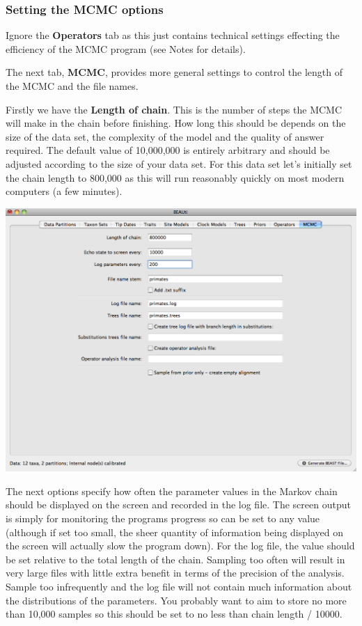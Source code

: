 \documentclass[12pt]{article}
\begin{document}
\medskip{}


\subsubsection*{Setting the MCMC options }

Ignore the \textbf{Operators} tab as this just contains technical
settings effecting the efficiency of the MCMC program (see Notes for details). 

The next tab, {\bf MCMC}, provides more general
settings to control the length of the MCMC and the file names. 

Firstly we have the \textbf{Length of chain}. This is the number of
steps the MCMC will make in the chain before finishing. How long this
should be depends on the size of the data set, the complexity of the
model and the quality of answer required. The default value of 10,000,000
is entirely arbitrary and should be adjusted according to the size
of your data set. For this data set let's initially set the chain
length to 800,000 as this will run reasonably quickly on most modern
computers (a few minutes).

\medskip{}

\includegraphics[scale=0.4]{figures/BEAUti_MCMC}

\medskip{}

The next options specify how often the parameter values in the Markov
chain should be displayed on the screen and recorded in the log file.
The screen output is simply for monitoring the programs progress so
can be set to any value (although if set too small, the sheer quantity
of information being displayed on the screen will actually slow the
program down). For the log file, the value should be set relative
to the total length of the chain. Sampling too often will result in
very large files with little extra benefit in terms of the precision
of the analysis. Sample too infrequently and the log file will not
contain much information about the distributions of the parameters. 
You probably want to aim to store no more than 10,000 samples so this should be
set to no less than chain length / 10000.
\end{document}
